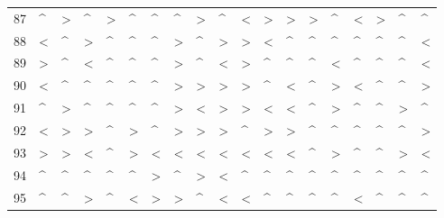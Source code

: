 \begin{tabular}{lllllllllllllllllll}
87  &  \textasciicircum  &  > &  \textasciicircum  &  > &  \textasciicircum  &  \textasciicircum  &  \textasciicircum  &  > &  \textasciicircum  &  < &  > &  > &  > &  \textasciicircum  &  < &  > &  \textasciicircum  &  \textasciicircum  \\
88  &  < &  \textasciicircum  &  > &  \textasciicircum  &  \textasciicircum  &  \textasciicircum  &  > &  \textasciicircum  &  > &  > &  < &  \textasciicircum  &  \textasciicircum  &  \textasciicircum  &  \textasciicircum  &  \textasciicircum  &  \textasciicircum  &  < \\
89  &  > &  \textasciicircum  &  < &  \textasciicircum  &  \textasciicircum  &  \textasciicircum  &  > &  \textasciicircum  &  < &  > &  \textasciicircum  &  \textasciicircum  &  \textasciicircum  &  < &  \textasciicircum  &  \textasciicircum  &  \textasciicircum  &  < \\
90  &  < &  \textasciicircum  &  \textasciicircum  &  \textasciicircum  &  \textasciicircum  &  \textasciicircum  &  > &  > &  > &  > &  \textasciicircum  &  < &  \textasciicircum  &  > &  < &  \textasciicircum  &  \textasciicircum  &  > \\
91  &  \textasciicircum  &  > &  \textasciicircum  &  \textasciicircum  &  \textasciicircum  &  \textasciicircum  &  > &  < &  > &  > &  < &  < &  \textasciicircum  &  > &  \textasciicircum  &  \textasciicircum  &  > &  \textasciicircum  \\
92  &  < &  > &  > &  \textasciicircum  &  > &  \textasciicircum  &  > &  > &  > &  \textasciicircum  &  > &  > &  \textasciicircum  &  \textasciicircum  &  \textasciicircum  &  \textasciicircum  &  \textasciicircum  &  > \\
93  &  > &  > &  < &  \textasciicircum  &  > &  < &  < &  < &  < &  < &  < &  < &  \textasciicircum  &  > &  \textasciicircum  &  \textasciicircum  &  > &  < \\
94  &  \textasciicircum  &  \textasciicircum  &  \textasciicircum  &  \textasciicircum  &  \textasciicircum  &  > &  \textasciicircum  &  > &  < &  \textasciicircum  &  \textasciicircum  &  \textasciicircum  &  \textasciicircum  &  \textasciicircum  &  \textasciicircum  &  \textasciicircum  &  \textasciicircum  &  \textasciicircum  \\
95  &  \textasciicircum  &  \textasciicircum  &  > &  \textasciicircum  &  < &  > &  > &  \textasciicircum  &  < &  < &  \textasciicircum  &  \textasciicircum  &  \textasciicircum  &  \textasciicircum  &  < &  \textasciicircum  &  \textasciicircum  &  \textasciicircum  \\

\end{tabular}
